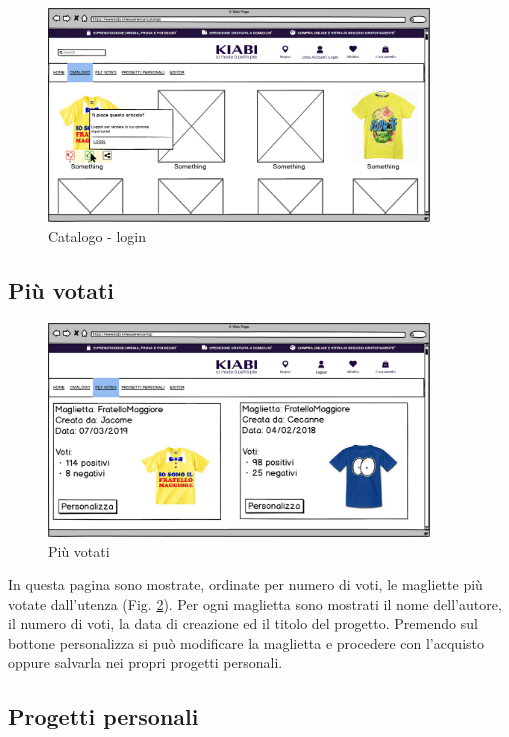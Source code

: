 \documentclass[12pt,italian,]{report}
\begin{document}
\begin{figure}[h]
\centering
\includegraphics[width=0.9\textwidth]{../balsamiq/balsamiq_finale/Catalogologin.png}
\caption{Catalogo - login}
\label{cat-login}
\end{figure}

\newpage
\subsection{Più votati}\label{piuxf9-votati}

\begin{figure}[h]
\centering
\includegraphics[width=0.9\textwidth]{../balsamiq/balsamiq_finale/MostRated.png}
\caption{Più votati}
\label{most-rated}
\end{figure}

In questa pagina sono mostrate, ordinate per numero di voti, le
magliette più votate dall'utenza (Fig. \ref{most-rated}). Per ogni maglietta sono mostrati
il nome dell'autore, il numero di voti, la data di creazione ed il titolo del
progetto. Premendo sul bottone personalizza si può modificare la
maglietta e procedere con l'acquisto oppure salvarla nei propri progetti personali.

\newpage
\hypertarget{progetti-personali}{%
\subsection{Progetti personali}\label{progetti-personali}}
\end{document}
